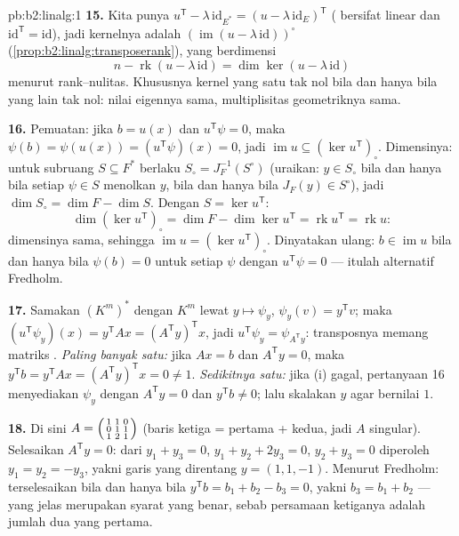\begin{solution}{pb:b2:linalg:1}
\textbf{15.} Kita punya $u^{\mathsf T} - \lambda\,\mathrm{id}_{E^*} = (u -
\lambda\,\mathrm{id}_E)^{\mathsf T}$ ( bersifat linear dan
$\mathrm{id}^{\mathsf T} = \mathrm{id}$), jadi kernelnya adalah
$(\operatorname{im}(u - \lambda\,\mathrm{id}))^\circ$
(\cref{prop:b2:linalg:transposerank}), yang berdimensi
\[
n - \operatorname{rk}(u - \lambda\,\mathrm{id})
= \dim\ker(u - \lambda\,\mathrm{id})
\]
menurut rank--nulitas. Khususnya kernel yang satu tak nol bila dan hanya
bila yang lain tak nol: nilai eigennya sama, multiplisitas geometriknya sama.

\textbf{16.} Pemuatan: jika $b = u(x)$ dan $u^{\mathsf T}\psi =
0$, maka $\psi(b) = \psi(u(x)) = (u^{\mathsf T}\psi)(x) = 0$, jadi
$\operatorname{im} u \subseteq (\ker u^{\mathsf T})_\circ$.
Dimensinya: untuk subruang $S \subseteq F^*$ berlaku $S_\circ =
J_F^{-1}(S^\circ)$ (uraikan: $y \in S_\circ$ bila dan hanya bila setiap
$\psi \in S$ menolkan $y$, bila dan hanya bila $J_F(y) \in S^\circ$),
jadi $\dim S_\circ = \dim F - \dim S$. Dengan $S = \ker u^{\mathsf T}$:
\[
\dim(\ker u^{\mathsf T})_\circ
= \dim F - \dim\ker u^{\mathsf T}
= \operatorname{rk} u^{\mathsf T} = \operatorname{rk} u :
\]
dimensinya sama, sehingga $\operatorname{im} u = (\ker
u^{\mathsf T})_\circ$. Dinyatakan ulang: $b \in \operatorname{im} u$ bila
dan hanya bila $\psi(b) = 0$ untuk setiap $\psi$ dengan $u^{\mathsf
T}\psi = 0$ --- itulah alternatif Fredholm.

\textbf{17.} Samakan $(K^m)^*$ dengan $K^m$ lewat $y \mapsto \psi_y$,
$\psi_y(v) = y^{\mathsf T}v$; maka $(u^{\mathsf T}\psi_y)(x) =
y^{\mathsf T}Ax = (A^{\mathsf T}y)^{\mathsf T}x$, jadi $u^{\mathsf
T}\psi_y = \psi_{A^{\mathsf T}y}$: transposnya memang matriks
. \emph{Paling banyak satu:} jika $Ax = b$ dan
$A^{\mathsf T}y = 0$, maka $y^{\mathsf T}b = y^{\mathsf T}Ax =
(A^{\mathsf T}y)^{\mathsf T}x = 0 \neq 1$. \emph{Sedikitnya satu:}
jika (i) gagal, pertanyaan 16 menyediakan $\psi_y$ dengan $A^{\mathsf T}y
= 0$ dan $y^{\mathsf T}b \neq 0$; lalu skalakan $y$ agar bernilai $1$.

\textbf{18.} Di sini $A = \begin{psmallmatrix} 1 & 1 & 0\\ 0 & 1 & 1\\
1 & 2 & 1\end{psmallmatrix}$ (baris ketiga = pertama + kedua, jadi $A$
singular). Selesaikan $A^{\mathsf T}y = 0$: dari $y_1 + y_3 = 0$, $y_1
+ y_2 + 2y_3 = 0$, $y_2 + y_3 = 0$ diperoleh $y_1 = y_2 = -y_3$, yakni
garis yang direntang $y = (1, 1, -1)$. Menurut Fredholm: terselesaikan
bila dan hanya bila $y^{\mathsf T}b = b_1 + b_2 - b_3 = 0$, yakni $b_3 =
b_1 + b_2$ --- yang jelas merupakan syarat yang benar, sebab persamaan
ketiganya adalah jumlah dua yang pertama.


\end{solution}
